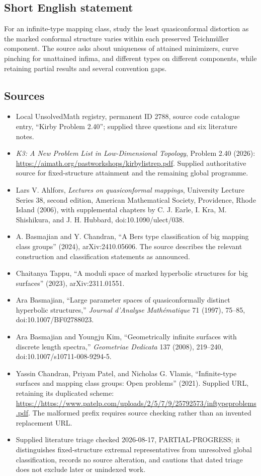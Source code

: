 \documentclass[11pt]{article}
\begin{document}
\subsection{Short English statement}
For an infinite-type mapping class, study the least quasiconformal distortion as the marked conformal structure varies within each preserved Teichmüller component. The source asks about uniqueness of attained minimizers, curve pinching for unattained infima, and different types on different components, while retaining partial results and several convention gaps.
\subsection{Sources}
\begin{itemize}
\item Local UnsolvedMath registry, permanent ID 2788, source code catalogue entry, ``Kirby Problem 2.40''; supplied three questions and six literature notes.
\item \emph{K3: A New Problem List in Low-Dimensional Topology}, Problem 2.40 (2026): \url{https://aimath.org/pastworkshops/kirbylistrep.pdf}. Supplied authoritative source for fixed-structure attainment and the remaining global programme.
\item [Ahl06] Lars V. Ahlfors, \emph{Lectures on quasiconformal mappings}, University Lecture Series 38, second edition, American Mathematical Society, Providence, Rhode Island (2006), with supplemental chapters by C. J. Earle, I. Kra, M. Shishikura, and J. H. Hubbard, doi:10.1090/ulect/038.
\item [BC24a] A. Basmajian and Y. Chandran, ``A Bers type classification of big mapping class groups'' (2024), arXiv:2410.05606. The source describes the relevant construction and classification statements as announced.
\item [Tap23] Chaitanya Tappu, ``A moduli space of marked hyperbolic structures for big surfaces'' (2023), arXiv:2311.01551.
\item [Bas97] Ara Basmajian, ``Large parameter spaces of quasiconformally distinct hyperbolic structures,'' \emph{Journal d'Analyse Math\'ematique} 71 (1997), 75--85, doi:10.1007/BF02788023.
\item [BK08] Ara Basmajian and Youngju Kim, ``Geometrically infinite surfaces with discrete length spectra,'' \emph{Geometriae Dedicata} 137 (2008), 219--240, doi:10.1007/s10711-008-9294-5.
\item [CPV21] Yassin Chandran, Priyam Patel, and Nicholas G. Vlamis, ``Infinite-type surfaces and mapping class groups: Open problems'' (2021). Supplied URL, retaining its duplicated scheme: \url{https://https://www.patelp.com/uploads/2/5/7/9/25792573/inftypeproblems.pdf}. The malformed prefix requires source checking rather than an invented replacement URL.
\item Supplied literature triage checked 2026-08-17, PARTIAL-PROGRESS; it distinguishes fixed-structure extremal representatives from unresolved global classification, records no source alteration, and cautions that dated triage does not exclude later or unindexed work.
\end{itemize}
\end{document}
